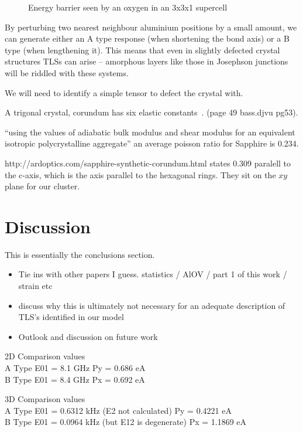 \begin{figure}[htb]
        \centering
\caption{\label{fig:clustpot}Energy barrier seen by an oxygen in an  3x3x1 supercell}
\end{figure}

By perturbing two nearest neighbour aluminium positions by a small amount, we can generate either an A type response (when shortening the bond axis) or a B type (when lengthening it). This means that even in slightly defected crystal structures TLSs can arise -- amorphous layers like those in Josephson junctions will be riddled with these systems.

We will need to identify a simple tensor to defect the crystal with.


A trigonal crystal, corundum has six elastic constants~\cite{Bass1995}. (page 49 bass.djvu pg53).

``using the values of adiabatic bulk modulus and shear modulus for an equivalent isotropic polycrystalline aggregate'' an average poisson ratio for Sapphire is 0.234\cite{Gercek2007}.

http://ardoptics.com/sapphire-synthetic-corundum.html states 0.309 paralell to the c-axis, which is the axis parallel to the hexagonal rings. They sit on the $xy$ plane for our cluster.
\section{Discussion}

This is essentially the conclusions section.

\begin{itemize}
    \item Tie ins with other papers I guess. statistics / AlOV / part 1 of this work / strain etc
    \item discuss why this is ultimately not necessary for an adequate description of TLS's identified in our model
    \item Outlook and discussion on future work
\end{itemize}

2D Comparison values\\
A Type E01 = 8.1 GHz Py = 0.686 eA\\
B Type E01 = 8.4 GHz Px = 0.692 eA

3D Comparison values\\
A Type E01 = 0.6312 kHz (E2 not calculated) Py = 0.4221 eA\\
B Type E01 = 0.0964 kHz (but E12 is degenerate) Px = 1.1869 eA

